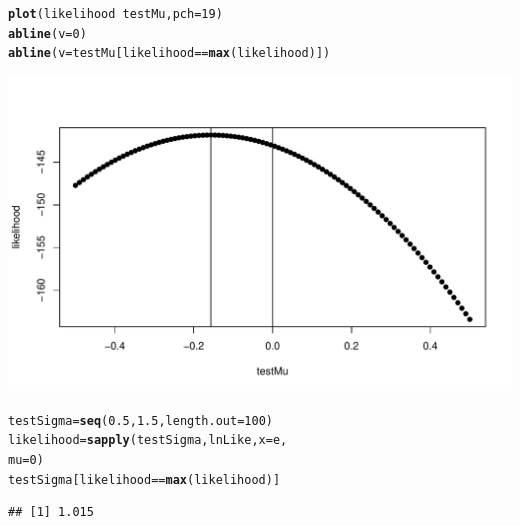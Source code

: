 \documentclass[xcolor=dvipsnames]{beamer}\usepackage[]{graphicx}\usepackage[]{color}
\makeatletter
\def\maxwidth{ %
  \ifdim\Gin@nat@width>\linewidth
    \linewidth
  \else
    \Gin@nat@width
  \fi
}
\newcommand{\hlnum}[1]{\textcolor[rgb]{0.686,0.059,0.569}{#1}}%
\newcommand{\hlopt}[1]{\textcolor[rgb]{0,0,0}{#1}}%
\newcommand{\hlstd}[1]{\textcolor[rgb]{0.345,0.345,0.345}{#1}}%
\newcommand{\hlkwb}[1]{\textcolor[rgb]{0.69,0.353,0.396}{#1}}%
\newcommand{\hlkwc}[1]{\textcolor[rgb]{0.333,0.667,0.333}{#1}}%
\newcommand{\hlkwd}[1]{\textcolor[rgb]{0.737,0.353,0.396}{\textbf{#1}}}%
\newenvironment{kframe}{%
 \def\at@end@of@kframe{}%
 \ifinner\ifhmode%
  \def\at@end@of@kframe{\end{minipage}}%
  \begin{minipage}{\columnwidth}%
 \fi\fi%
 \def\FrameCommand##1{\hskip\@totalleftmargin \hskip-\fboxsep
 \colorbox{shadecolor}{##1}\hskip-\fboxsep
     \hskip-\linewidth \hskip-\@totalleftmargin \hskip\columnwidth}%
 \MakeFramed {\advance\hsize-\width
   \@totalleftmargin\z@ \linewidth\hsize
   \@setminipage}}%
 {\par\unskip\endMakeFramed%
 \at@end@of@kframe}
\newenvironment{knitrout}{}{} %
\makeatother
\begin{document}
\begin{frame}[fragile]
\begin{knitrout}
\color{fgcolor}\begin{kframe}
\begin{alltt}
\hlkwd{plot}\hlstd{(likelihood} \hlopt{~} \hlstd{testMu,} \hlkwc{pch} \hlstd{=} \hlnum{19}\hlstd{)}
\hlkwd{abline}\hlstd{(}\hlkwc{v} \hlstd{=} \hlnum{0}\hlstd{)}
\hlkwd{abline}\hlstd{(}\hlkwc{v} \hlstd{= testMu[likelihood} \hlopt{==} \hlkwd{max}\hlstd{(likelihood)])}
\end{alltt}
\end{kframe}
\includegraphics[width=\maxwidth]{figure/unnamed-chunk-1} 

\end{knitrout}

\end{frame}

\begin{frame}[fragile]
\begin{knitrout}
\color{fgcolor}\begin{kframe}
\begin{alltt}
\hlstd{testSigma} \hlkwb{=} \hlkwd{seq}\hlstd{(}\hlnum{0.5}\hlstd{,} \hlnum{1.5}\hlstd{,} \hlkwc{length.out} \hlstd{=} \hlnum{100}\hlstd{)}
\hlstd{likelihood} \hlkwb{=} \hlkwd{sapply}\hlstd{(testSigma, lnLike,} \hlkwc{x} \hlstd{= e,}
    \hlkwc{mu} \hlstd{=} \hlnum{0}\hlstd{)}
\hlstd{testSigma[likelihood} \hlopt{==} \hlkwd{max}\hlstd{(likelihood)]}
\end{alltt}
\begin{verbatim}
## [1] 1.015
\end{verbatim}
\end{kframe}
\end{knitrout}

\end{frame}
\end{document}
